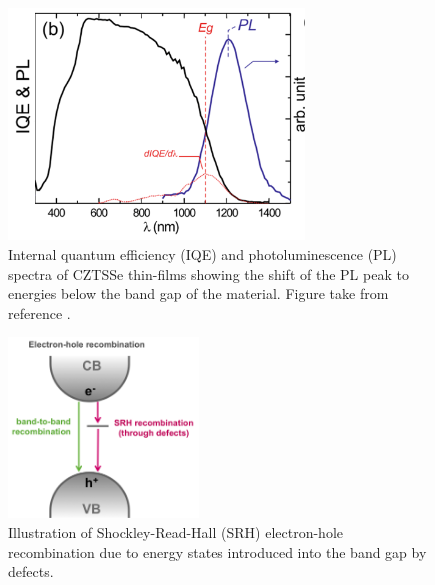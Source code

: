 \begin{figure}[h!]
  \centering
    \includegraphics[width=0.7\textwidth]{figures/CZTS_PL.png}
    \caption{Internal quantum efficiency (IQE) and photoluminescence (PL) spectra of CZTSSe thin-films showing the shift of the PL peak to energies below the band gap of the material. Figure take from reference .}
  \label{CZTS_PL}
\end{figure}

\begin{figure}[h!]
  \centering
    \includegraphics[width=0.45\textwidth]{figures/SRH.png}
    \caption{Illustration of Shockley-Read-Hall (SRH) electron-hole recombination due to energy states introduced into the band gap by defects.}
  \label{SRH}
\end{figure}

